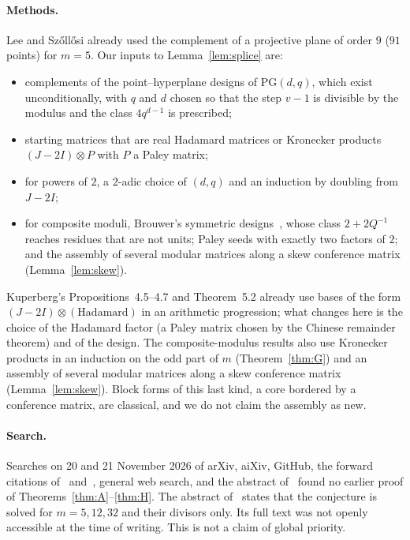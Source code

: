 \documentclass[10pt]{article}
\theoremstyle{remark}
\newcommand{\PG}{\mathrm{PG}}
\begin{document}
\paragraph{Methods.}
Lee and Sz\H{o}ll\H{o}si already used the complement of a projective plane of order $9$ ($91$ points) for $m=5$. Our inputs to Lemma~\ref{lem:splice} are:
\begin{itemize}
\item complements of the point--hyperplane designs of $\PG(d,q)$, which exist unconditionally, with $q$ and $d$ chosen so that the step $v-1$ is divisible by the modulus and the class $4q^{d-1}$ is prescribed;
\item starting matrices that are real Hadamard matrices or Kronecker products $(J-2I)\otimes P$ with $P$ a Paley matrix;
\item for powers of $2$, a $2$-adic choice of $(d,q)$ and an induction by doubling from $J-2I$;
\item for composite moduli, Brouwer's symmetric designs~\cite{Br83}, whose class $2+2Q^{-1}$ reaches residues that are not units; Paley seeds with exactly two factors of $2$; and the assembly of several modular matrices along a skew conference matrix (Lemma~\ref{lem:skew}).
\end{itemize}
Kuperberg's Propositions~4.5--4.7 and Theorem~5.2 already use bases of the form $(J-2I)\otimes(\text{Hadamard})$ in an arithmetic progression; what changes here is the choice of the Hadamard factor (a Paley matrix chosen by the Chinese remainder theorem) and of the design. The composite-modulus results also use Kronecker products in an induction on the odd part of $m$ (Theorem~\ref{thm:G}) and an assembly of several modular matrices along a skew conference matrix (Lemma~\ref{lem:skew}). Block forms of this last kind, a core bordered by a conference matrix, are classical, and we do not claim the assembly as new.

\paragraph{Search.}
Searches on 20 and 21 November 2026 of arXiv, aiXiv, GitHub, the forward citations of~\cite{K} and~\cite{LS}, general web search, and the abstract of~\cite{E26} found no earlier proof of Theorems~\ref{thm:A}--\ref{thm:H}. The abstract of~\cite{E26} states that the conjecture is solved for $m=5,12,32$ and their divisors only. Its full text was not openly accessible at the time of writing. This is not a claim of global priority.
\end{document}
